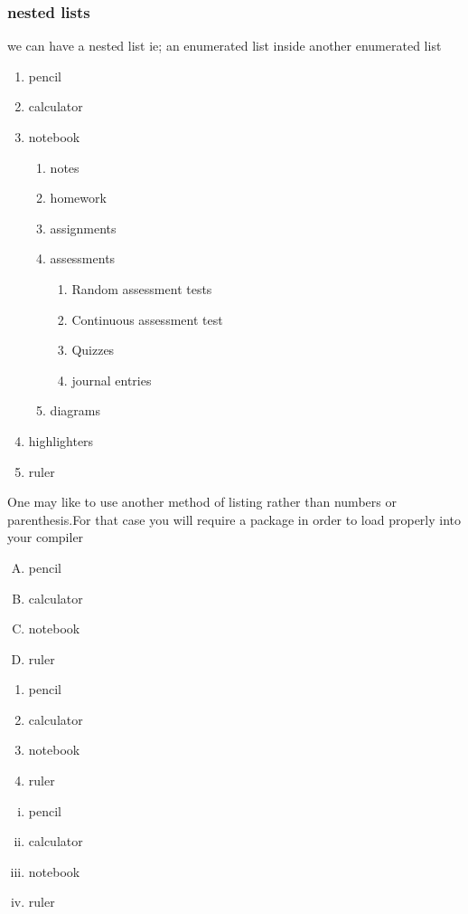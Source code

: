 \documentclass[a4paper,12pt]{article}
\begin{document}
  	 \subsubsection{nested lists}
  we can have a nested list ie; an enumerated list inside another enumerated list	 
  	 \begin{enumerate}
  	 	\item pencil
  	 	\item calculator
  	 	\item notebook
  	 	\begin{enumerate}
  	 		\item notes
  	 		\item homework
  	 		\item assignments
  	 		\item assessments
  	 		\begin{enumerate}
  	 			\item Random assessment tests
  	 			\item Continuous assessment test
  	 			\item Quizzes
  	 			\item journal entries
  	 			
  	 			
  	 		\end{enumerate}
  	 		\item diagrams
  	 	\end{enumerate}
  	 	\item highlighters
  	 	\item ruler
  	 \end{enumerate}
  	 
  	 \vspace{1cm}
  	 
  	 One may like  to use another method of listing rather than numbers or parenthesis.For that case you will require a package in order to load properly into your compiler\\
  	\begin {enumerate}[A.]
  	 \item pencil
  	 \item calculator
  	 \item notebook
  	 \item ruler
  	 \end{enumerate}
  	 
  	 \vspace{3cm}
  	 	\begin {enumerate}[1.]
  	 \item pencil
  	 \item calculator
  	 \item notebook
  	 \item ruler
  	 \end{enumerate}
  	 \vspace{0.1cm}
  	 \begin {enumerate}[i.]
  	 \item pencil
  	 \item calculator
  	 \item notebook
  	 \item ruler
  	 \end{enumerate}
  	 
\end{document}
